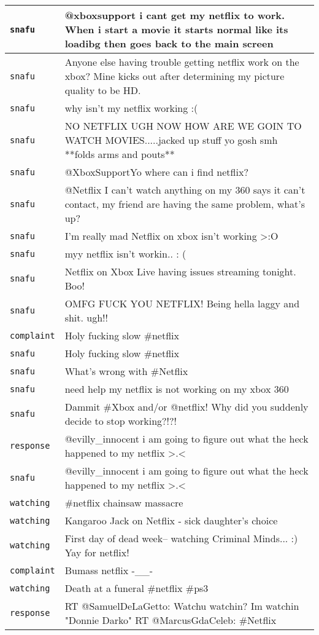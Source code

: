 {\begin{longtable}{|l|p{160mm}|}
      \tabularnewline\hline
         \texttt{snafu} & @xboxsupport i cant get my netflix to work. When i start a movie it starts normal like its loadibg then goes back to the main screen
      \tabularnewline\hline
         \texttt{snafu} & Anyone else having trouble getting netflix work on the xbox? Mine kicks out after determining my picture quality to be HD.
      \tabularnewline\hline
         \texttt{snafu} & why isn't my netflix working :(
      \tabularnewline\hline
         \texttt{snafu} & NO NETFLIX UGH NOW HOW ARE WE GOIN TO WATCH MOVIES.....jacked up stuff yo gosh smh **folds arms and pouts**
      \tabularnewline\hline
         \texttt{snafu} & @XboxSupportYo where can i find netflix?
      \tabularnewline\hline
         \texttt{snafu} & @Netflix I can't watch anything on my 360 says it can't contact, my friend are having the same problem, what's up?
      \tabularnewline\hline
         \texttt{snafu} & I'm really mad Netflix on xbox isn't working >:O
      \tabularnewline\hline
         \texttt{snafu} & myy netflix isn't workin.. : (
      \tabularnewline\hline
         \texttt{snafu} & Netflix on Xbox Live having issues streaming tonight. Boo!
      \tabularnewline\hline
         \texttt{snafu} & OMFG FUCK YOU NETFLIX! Being hella laggy and shit. ugh!!
      \tabularnewline\hline
         \texttt{complaint} & Holy fucking slow \#netflix
      \tabularnewline\hline
         \texttt{snafu} & Holy fucking slow \#netflix
      \tabularnewline\hline
         \texttt{snafu} & What's wrong with \#Netflix
      \tabularnewline\hline
         \texttt{snafu} & need help my netflix is not working on my xbox 360
      \tabularnewline\hline
         \texttt{snafu} & Dammit \#Xbox and/or @netflix! Why did you suddenly decide to stop working?!?!
      \tabularnewline\hline
         \texttt{response} & @evilly\_innocent i am going to figure out what the heck happened to my netflix >.<
      \tabularnewline\hline
         \texttt{snafu} & @evilly\_innocent i am going to figure out what the heck happened to my netflix >.<
      \tabularnewline\hline
         \texttt{watching} & \#netflix chainsaw massacre
      \tabularnewline\hline
         \texttt{watching} & Kangaroo Jack on Netflix - sick daughter's choice
      \tabularnewline\hline
         \texttt{watching} & First day of dead week-- watching Criminal Minds... :) Yay for netflix!
      \tabularnewline\hline
         \texttt{complaint} & Bumass netflix -\_\_-
      \tabularnewline\hline
         \texttt{watching} & Death at a funeral \#netflix \#ps3
      \tabularnewline\hline
         \texttt{response} & RT @SamuelDeLaGetto: Watchu watchin? Im watchin "Donnie Darko" RT @MarcusGdaCeleb: \#Netflix

\end{longtable}}
